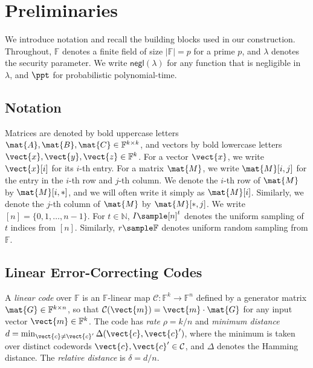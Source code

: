 \section{Preliminaries}
\label{sec:prelim}

We introduce notation and recall the building blocks used in our construction.
Throughout, $\mathbb{F}$ denotes a finite field of size $|\mathbb{F}| = p$ for a prime $p$, and $\lambda$ denotes the security parameter.
We write $\textsf{negl}(\lambda)$ for any function that is negligible in~$\lambda$, and $\ppt$ for probabilistic polynomial-time.

\subsection{Notation}
\label{sec:notation}

Matrices are denoted by bold uppercase letters $\mat{A}, \mat{B}, \mat{C} \in \mathbb{F}^{k \times k}$, and vectors by bold lowercase letters $\vect{x}, \vect{y}, \vect{z} \in \mathbb{F}^k$.
For a vector $\vect{x}$, we write $\vect{x}[i]$ for its $i$-th entry. For a
matrix $\mat{M}$, we write $\mat{M}[i,j]$ for the entry in the $i$-th row and $j$-th column. 
We denote the $i$-th row of $\mat{M}$ by $\mat{M}[i,*]$, and we will often write it simply as $\mat{M}[i]$. 
Similarly, we denote the $j$-th column of $\mat{M}$ by $\mat{M}[*,j]$. We write $[n] = \{0,1,\ldots,n-1\}$. For $t \in \mathbb{N}$, $I \sample [n]^t$ denotes the uniform sampling of $t$ indices from $[n]$. Similarly, $r \sample \mathbb{F}$ denotes uniform random sampling from
$\mathbb{F}$.



\subsection{Linear Error-Correcting Codes}
\label{sec:prelim-codes}

A \emph{linear code} over $\mathbb{F}$ is an $\mathbb{F}$-linear map
$\mathcal{C}: \mathbb{F}^k \to \mathbb{F}^n$ defined by a generator matrix
$\mat{G} \in \mathbb{F}^{k \times n}$, so that
$\mathcal{C}(\vect{m}) = \vect{m} \cdot \mat{G}$ for any input vector
$\vect{m} \in \mathbb{F}^k$.
The code has \emph{rate} $\rho = k/n$ and \emph{minimum distance} $d = \min_{\vect{c} \neq \vect{c}'} \Delta(\vect{c}, \vect{c}')$,
where the minimum is taken over distinct codewords
$\vect{c}, \vect{c}' \in \mathcal{C}$, and $\Delta$ denotes the Hamming distance.
The \emph{relative distance} is $\delta = d/n$.


